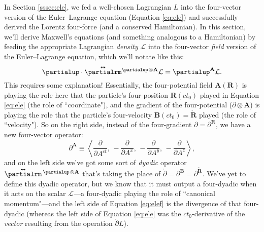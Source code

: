 \documentclass[12pt]{article}
\renewcommand{\vv}[1]{\mathbf{#1}}
\newcommand{\tightoverset}[2]{%
  \mathop{#2}\limits^{\vbox to -.5ex{\kern-0.75ex\hbox{$#1$}\vss}}}
\newcommand{\inlinedy}[1]{\tightoverset{\text{\tiny$\bm\leftrightarrow$}}{#1}}
\newcommand{\capdy}[1]{ \overset{ \text{\tiny$\bm\leftrightarrow$} }{\vphantom{\text{\small{A}}}\smash{#1}} }
\begin{document}
In Section \ref{sssec:ele}, we fed a well-chosen Lagrangian $L$ into the four-vector version of the Euler--Lagrange equation (Equation \ref{eq:ele}) and successfully derived the Lorentz four-force (and a conserved Hamiltonian). In this section, we'll derive Maxwell's equations (and something analogous to a Hamiltonian) by feeding the appropriate Lagrangian \emph{density} $\mathcal{L}$ into the four-vector \emph{field} version of the Euler--Lagrange equation, which we'll notate like this:
\begin{equation}\label{eq:elef}
\partialup \cdot \capdy{\partialrm} {}^{\partialup \mkern2mu \otimes \vv A} \mathcal{L} = \partialup^{\vv A} \mathcal{L} .
\end{equation}
This requires some explanation! Essentially, the four-potential field ${\vv A (\vv R)}$ is playing the role here that the particle's four-position $\vv R (ct_0)$ played in Equation \ref{eq:ele} (the role of ``coordinate"), and the gradient of the four-potential ($\partialup \otimes \vv A$) is playing the role that the particle's four-velocity $\vv B (ct_0) = \mathring{\vv R}$ played (the role of ``velocity"). So on the right side, instead of the four-gradient $\partialup = \partialup^{\vv R}$, we have a new four-vector operator:
\begin{equation*}
\partialup^{\vv A} \equiv \left \langle \dfrac{\partial}{\partial A^{ct}} , \,  - \dfrac{\partial}{\partial A^x} , \, - \dfrac{\partial}{\partial A^y} , \, - \dfrac{\partial}{\partial A^z} \right \rangle ,
\end{equation*}
and on the left side we've got some sort of \emph{dyadic} operator $\inlinedy{\partialrm} {}^{\partialup \mkern2mu \otimes \vv A}$ that's taking the place of $\mathring{\partialup} = \partialup^{\vv B} = \partialup^{\mathring{\vv R}}$. We've yet to define this dyadic operator, but we know that it must output a four-dyadic when it acts on the scalar $\mathcal{L}$---a four-dyadic playing the role of ``canonical momentum"---and the left side of Equation \ref{eq:elef} is the divergence of that four-dyadic (whereas the left side of Equation \ref{eq:ele} was the $ct_0$-derivative of the \emph{vector} resulting from the operation $\mathring{\partialup} L$).
\end{document}
